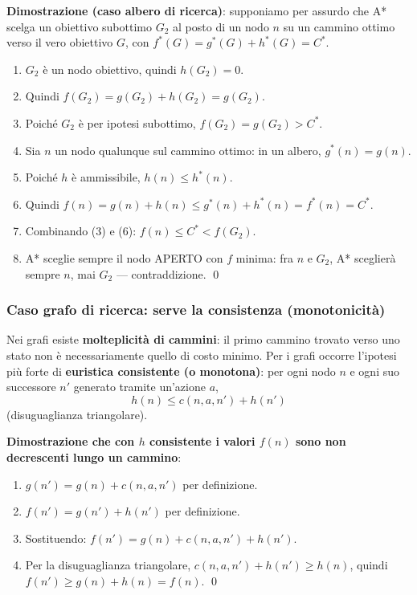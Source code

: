\documentclass[11pt,a4paper]{report}
\begin{document}
\textbf{Dimostrazione (caso albero di ricerca)}: supponiamo per assurdo che A* scelga un obiettivo subottimo $G_2$ al posto di un nodo $n$ su un cammino ottimo verso il vero obiettivo $G$, con $f^*(G)=g^*(G)+h^*(G)=C^*$.
\begin{enumerate}
  \item $G_2$ è un nodo obiettivo, quindi $h(G_2)=0$.
  \item Quindi $f(G_2)=g(G_2)+h(G_2)=g(G_2)$.
  \item Poiché $G_2$ è per ipotesi subottimo, $f(G_2)=g(G_2)>C^*$.
  \item Sia $n$ un nodo qualunque sul cammino ottimo: in un albero, $g^*(n)=g(n)$.
  \item Poiché $h$ è ammissibile, $h(n) \le h^*(n)$.
  \item Quindi $f(n)=g(n)+h(n) \le g^*(n)+h^*(n)=f^*(n)=C^*$.
  \item Combinando (3) e (6): $f(n) \le C^* < f(G_2)$.
  \item A* sceglie sempre il nodo APERTO con $f$ minima: fra $n$ e $G_2$, A* sceglierà sempre $n$, mai $G_2$ --- contraddizione. \qed
\end{enumerate}

\subsubsection*{Caso grafo di ricerca: serve la consistenza (monotonicità)}

Nei grafi esiste \textbf{molteplicità di cammini}: il primo cammino trovato verso uno stato non è necessariamente quello di costo minimo. Per i grafi occorre l'ipotesi più forte di \textbf{euristica consistente (o monotona)}: per ogni nodo $n$ e ogni suo successore $n'$ generato tramite un'azione $a$,
\[
h(n) \le c(n,a,n') + h(n')
\]
(disuguaglianza triangolare).

\textbf{Dimostrazione che con $h$ consistente i valori $f(n)$ sono non decrescenti lungo un cammino}:
\begin{enumerate}
  \item $g(n') = g(n) + c(n,a,n')$ per definizione.
  \item $f(n') = g(n') + h(n')$ per definizione.
  \item Sostituendo: $f(n') = g(n) + c(n,a,n') + h(n')$.
  \item Per la disuguaglianza triangolare, $c(n,a,n')+h(n') \ge h(n)$, quindi $f(n') \ge g(n)+h(n)=f(n)$. \qed
\end{enumerate}
\end{document}

